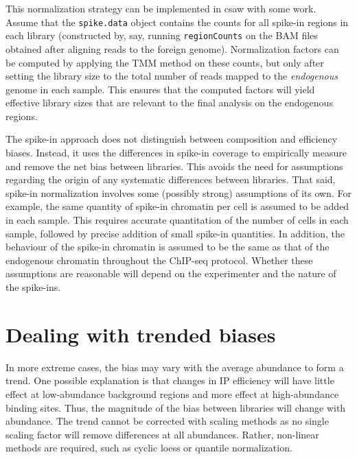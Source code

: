\documentclass[12pt]{report}
\renewenvironment{Schunk}{\vspace{0pt}}{\vspace{0pt}}
\newcommand{\pkgname}{csaw}
\newcommand{\code}[1]{{\small\texttt{#1}}}
\begin{document}
This normalization strategy can be implemented in \pkgname{} with some work.
Assume that the \code{spike.data} object contains the counts for all spike-in regions in each library (constructed by, say, running \code{regionCounts} on the BAM files obtained after aligning reads to the foreign genome).
Normalization factors can be computed by applying the TMM method on these counts, but only after setting the library size to the total number of reads mapped to the \textit{endogenous} genome in each sample.
This ensures that the computed factors will yield effective library sizes that are relevant to the final analysis on the endogenous regions.


\begin{Schunk}
\end{Schunk}

The spike-in approach does not distinguish between composition and efficiency biases.
Instead, it uses the differences in spike-in coverage to empirically measure and remove the net bias between libraries.
This avoids the need for assumptions regarding the origin of any systematic differences between libraries.
That said, spike-in normalization involves some (possibly strong) assumptions of its own.
For example, the same quantity of spike-in chromatin per cell is assumed to be added in each sample.
This requires accurate quantitation of the number of cells in each sample, followed by precise addition of small spike-in quantities.
In addition, the behaviour of the spike-in chromatin is assumed to be the same as that of the endogenous chromatin throughout the ChIP-seq protocol.
Whether these assumptions are reasonable will depend on the experimenter and the nature of the spike-ins. 

\section{Dealing with trended biases}
In more extreme cases, the bias may vary with the average abundance to form a trend. 
One possible explanation is that changes in IP efficiency will have little effect at low-abundance background regions and more effect at high-abundance binding sites. 
Thus, the magnitude of the bias between libraries will change with abundance. 
The trend cannot be corrected with scaling methods as no single scaling factor will remove differences at all abundances.
Rather, non-linear methods are required, such as cyclic loess or quantile normalization.
\end{document}
